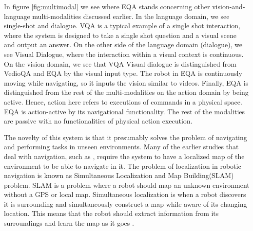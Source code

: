 In figure \ref{fig:multimodal} we see where EQA stands concerning other vision-and-language multi-modalities discussed earlier. In the language domain, we see single-shot and dialogue. VQA is a typical example of a single shot interaction, where the system is designed to take a single shot question and a visual scene and output an answer. On the other side of the language domain (dialogue), we see Visual Dialogue, where the interaction within a visual context is continuous. On the vision domain, we see that VQA Visual dialogue is distinguished from VedioQA and EQA by the visual input type. The robot in EQA is continuously moving while navigating, so it inputs the vision similar to videos. Finally, EQA is distinguished from the rest of the multi-modalities on the action domain by being active. Hence, action here refers to executions of commands in a physical space. EQA is action-active by its navigational functionality. The rest of the modalities are passive with no functionalities of physical action execution. 

The novelty of this system is that it presumably solves the problem of navigating and performing tasks in unseen environments. Many of the earlier studies that deal with navigation, such as \cite{kruijff2007situated},\cite{lauria2001training} require the system to have a localized map of the environment to be able to navigate in it. The problem of localization in robotic navigation is known as Simultaneous Localization and Map Building(SLAM) problem. SLAM is a problem where a robot should map an unknown environment without a GPS or local map. Simultaneous localization is when a robot discovers it is surrounding and simultaneously construct a map while aware of its changing location. This means that the robot should extract information from its surroundings and learn the map as it goes \cite{grisetti2010tutorial} \cite{938381} \cite{8482266}. 

